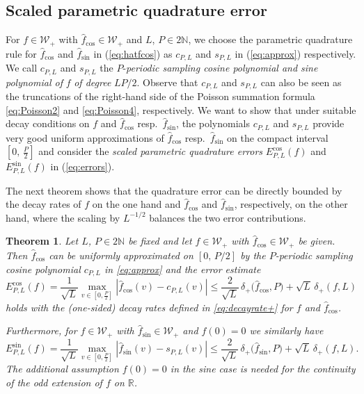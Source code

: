 \documentclass[11pt,a4paper]{scrartcl}
\newtheorem{theorem}{Theorem}[section]
\numberwithin{equation}{section}
\numberwithin{table}{section}
\numberwithin{figure}{section}
\newcommand{\R}{\mathbb R}
\newcommand{\N}{\mathbb N}
\newcommand{\Wp}{{\mathcal W}_{+}}
\newcommand{\fcos}{{\hat f}_{\cos}}
\newcommand{\fsin}{{\hat f}_{\sin}}
\newcommand{\dpl}{\delta_{+}}
\newcommand{\Ecos}{E^{\cos}}
\newcommand{\Esin}{E^{\sin}}
\begin{document}
\medskip

\subsection{Scaled parametric quadrature error}
\label{sec:error}

For $f \in \Wp$ with $\fcos \in \Wp$ and  $L$, $P \in 2\N$, we choose the  parametric quadrature rule for $\fcos$ and $\fsin$ in (\ref{eq:hatfcos})
as $c_{P,L}$  and $s_{P,L}$ in (\ref{eq:approx}) respectively.
We call $c_{P,L}$ and $s_{P,L}$ the $P$-\emph{periodic sampling cosine polynomial and sine polynomial of} $f$ \emph{of
degree} $LP/2$.
Observe that $c_{P,L}$ and $s_{P,L}$ can also be seen as
 the truncations of the right-hand side of the Poisson summation formula \eqref{eq:Poisson2} and  \eqref{eq:Poisson4}, respectively.
We want to show that under
suitable decay conditions on $f$ and $\fcos$ resp.\ $\fsin$, the polynomials $c_{P,L}$ and $s_{P,L}$ provide very
good uniform approximations of $\fcos$ resp.\  $\fsin$ on the compact interval $[0,\, \frac{P}{2}]$ and
consider the  \emph{scaled parametric quadrature errors} $\Ecos_{P,L}(f)$ and $\Esin_{P,L}(f)$ in (\ref{eq:errors}).

The next theorem shows that the quadrature error can be directly bounded by the decay rates of $f$ on the one hand and $\fcos$ and  $\fsin$, respectively, on the other hand, where
the scaling by $L^{-1/2}$ balances the two error contributions.

\begin{theorem}
\label{Thm:samplingcospolynomial}
Let $L$, $P \in 2 \N$ be fixed and let $f \in \Wp$ with $\fcos \in \Wp$ be given.
Then $\fcos$ can be uniformly approximated on $[0,\,P/2]$ by the $P$-periodic
sampling cosine polynomial $c_{P,L}$ in  \eqref{eq:approx}
and  the error
estimate
\begin{equation}
\label{eq:cosmain}
 \textstyle \Ecos_{P,L}(f) =  \textstyle \frac{1}{\sqrt{L}} \max\limits_{v \in [0,\frac{P}{2}]} |\hat{f}_{\cos} (v)\! - \!c_{P,L}(v)|\leq \frac{2}{\sqrt L}\,\dpl\big(\fcos, P\big) + \sqrt L \,\dpl(f,L)
\end{equation}
holds with the (one-sided) decay rates defined in \eqref{eq:decayrate+} for $f$ and $\fcos$.

Furthermore, for $f \in \Wp$ with $\fsin \in \Wp$ and $f(0)=0$  we similarly  have
\begin{equation}
\label{eq:sinmain}
 \textstyle \Esin_{P,L}(f)= \textstyle \frac{1}{\sqrt{L}} \max\limits_{v \in [0,\frac{P}{2}]} |\hat{f}_{\sin} (v)\! - \!s_{P,L}(v)|
  \leq \frac{2}{\sqrt L}\,\dpl\big(\fsin, P\big) + \sqrt L \,\dpl(f,L).
\end{equation}
The additional assumption $f(0)=0$ in the sine case is needed for the continuity of the odd
extension of $f$ on $\R$.
\end{theorem}
\end{document}
